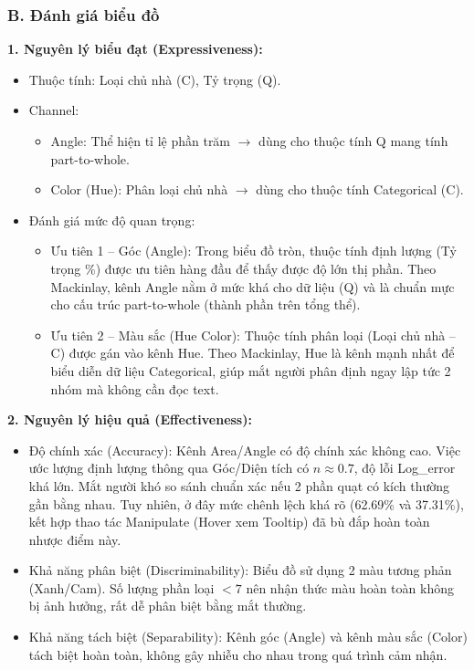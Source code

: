 \subsubsection*{B. Đánh giá biểu đồ}

\textbf{1. Nguyên lý biểu đạt (Expressiveness):}

\begin{itemize}
    \item Thuộc tính: Loại chủ nhà (C), Tỷ trọng (Q).
    \item Channel:
    \begin{itemize}
        \item Angle: Thể hiện tỉ lệ phần trăm $\rightarrow$ dùng cho thuộc tính Q mang tính part-to-whole.
        \item Color (Hue): Phân loại chủ nhà $\rightarrow$ dùng cho thuộc tính Categorical (C).
    \end{itemize}
    \item Đánh giá mức độ quan trọng:
    \begin{itemize}
        \item Ưu tiên 1 -- Góc (Angle): Trong biểu đồ tròn, thuộc tính định lượng (Tỷ trọng \%) được ưu tiên hàng đầu để thấy được độ lớn thị phần. Theo Mackinlay, kênh Angle nằm ở mức khá cho dữ liệu (Q) và là chuẩn mực cho cấu trúc part-to-whole (thành phần trên tổng thể).
        \item Ưu tiên 2 -- Màu sắc (Hue Color): Thuộc tính phân loại (Loại chủ nhà -- C) được gán vào kênh Hue. Theo Mackinlay, Hue là kênh mạnh nhất để biểu diễn dữ liệu Categorical, giúp mắt người phân định ngay lập tức 2 nhóm mà không cần đọc text.
    \end{itemize}
\end{itemize}

\textbf{2. Nguyên lý hiệu quả (Effectiveness):}

\begin{itemize}
    \item Độ chính xác (Accuracy): Kênh Area/Angle có độ chính xác không cao. Việc ước lượng định lượng thông qua Góc/Diện tích có $n \approx 0.7$, độ lỗi Log\_error khá lớn. Mắt người khó so sánh chuẩn xác nếu 2 phần quạt có kích thường gần bằng nhau. Tuy nhiên, ở đây mức chênh lệch khá rõ (62.69\% và 37.31\%), kết hợp thao tác Manipulate (Hover xem Tooltip) đã bù đắp hoàn toàn nhược điểm này.
    \item Khả năng phân biệt (Discriminability): Biểu đồ sử dụng 2 màu tương phản (Xanh/Cam). Số lượng phần loại $< 7$ nên nhận thức màu hoàn toàn không bị ảnh hưởng, rất dễ phân biệt bằng mắt thường.
    \item Khả năng tách biệt (Separability): Kênh góc (Angle) và kênh màu sắc (Color) tách biệt hoàn toàn, không gây nhiễu cho nhau trong quá trình cảm nhận.
\end{itemize}

